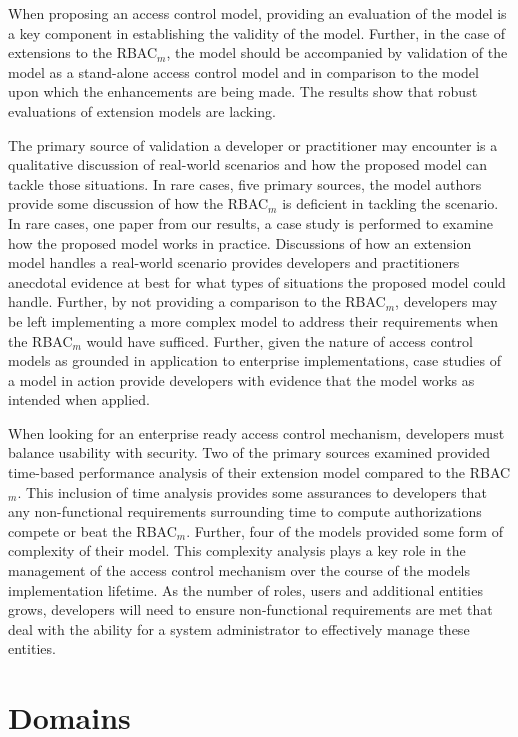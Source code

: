 When proposing an access control model, providing an evaluation of the model is a key component in establishing the validity of the model. 
Further, in the case of extensions to the RBAC$_{m}$, the model should be accompanied by validation of the model as a stand-alone
access control model and in comparison to the model upon which the enhancements are being made. The results show that robust evaluations of
extension models are lacking. 

The primary source of validation a developer or practitioner may encounter is a qualitative discussion of real-world
scenarios and how the proposed model can tackle those situations. In rare cases, five primary sources, the model 
authors provide some discussion of how the RBAC$_{m}$ is deficient in tackling the scenario. In rare cases, 
one paper from our results, a case study is performed to examine how the proposed model works in practice. Discussions
of how an extension model handles a real-world scenario provides developers and practitioners anecdotal evidence at best
for what types of situations the proposed model could handle. Further, by not providing a comparison to the RBAC$_{m}$, developers may be left implementing a more complex model to address their requirements when the RBAC$_{m}$ would
have sufficed.  Further, given the nature of access control models as grounded in application to enterprise implementations, 
case studies of a model in action provide developers with evidence that the model works as intended when applied.

When looking for an enterprise ready access control mechanism, developers must balance usability with security. 
Two of the primary sources examined provided time-based performance analysis of their extension model compared
to the RBAC$_{m}$. This inclusion of time analysis provides some assurances to developers that any non-functional
requirements surrounding time to compute authorizations compete or beat the RBAC$_{m}$. Further, four of the models provided
some form of complexity of their model. This complexity analysis plays a key role in the management of the access control mechanism
over the course of the models implementation lifetime. As the number of roles, users and additional entities grows, developers will 
need to ensure non-functional requirements are met that deal with the ability for a system administrator to effectively manage these
entities.


\section{Domains} \label{sec:domains}


